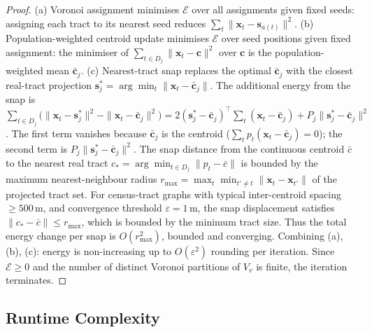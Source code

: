 \begin{proof}
(a) Voronoi assignment minimises $\mathcal{E}$ over all assignments given
    fixed seeds: assigning each tract to its nearest seed reduces
    $\sum_t \|\mathbf{x}_t - \mathbf{s}_{a(t)}\|^2$.
(b) Population-weighted centroid update minimises $\mathcal{E}$ over
    seed positions given fixed assignment: the minimiser of
    $\sum_{t \in D_j}\|\mathbf{x}_t - \mathbf{c}\|^2$ over $\mathbf{c}$ is the
    population-weighted mean $\bar{\mathbf{c}}_j$.
(c) Nearest-tract snap replaces the optimal $\bar{\mathbf{c}}_j$ with the closest
    real-tract projection $\mathbf{s}_j^* = \arg\min_{t}\|\mathbf{x}_t - \bar{\mathbf{c}}_j\|$.
    The additional energy from the snap is
    $\sum_{t \in D_j}\bigl(\|\mathbf{x}_t - \mathbf{s}_j^*\|^2 - \|\mathbf{x}_t - \bar{\mathbf{c}}_j\|^2\bigr)
    = 2(\mathbf{s}_j^* - \bar{\mathbf{c}}_j)^\top \sum_{t}(\mathbf{x}_t - \bar{\mathbf{c}}_j)
    + P_j\|\mathbf{s}_j^* - \bar{\mathbf{c}}_j\|^2$.
    The first term vanishes because $\bar{\mathbf{c}}_j$ is the centroid
    ($\sum_t p_t(\mathbf{x}_t - \bar{\mathbf{c}}_j) = 0$); the second term
    is $P_j\|\mathbf{s}_j^* - \bar{\mathbf{c}}_j\|^2$.
    The snap distance from the continuous centroid $\bar{c}$ to the nearest
    real tract $c_* = \arg\min_{t \in D_j} \|p_t - \bar{c}\|$ is bounded by
    the maximum nearest-neighbour radius
    $r_{\max} = \max_t \min_{t' \neq t} \|\mathbf{x}_t - \mathbf{x}_{t'}\|$
    of the projected tract set.
    For census-tract graphs with typical inter-centroid spacing $\geq 500\,$m,
    and convergence threshold $\varepsilon = 1\,$m, the snap displacement
    satisfies $\|c_* - \bar{c}\| \leq r_{\max}$, which is bounded by the
    minimum tract size.
    Thus the total energy change per snap is $O(r_{\max}^2)$, bounded and
    converging.
Combining (a), (b), (c): energy is non-increasing up to $O(\varepsilon^2)$
rounding per iteration.
Since $\mathcal{E} \ge 0$ and the number of distinct Voronoi partitions of
$V_v$ is finite, the iteration terminates.
\end{proof}

\subsection{Runtime Complexity}

